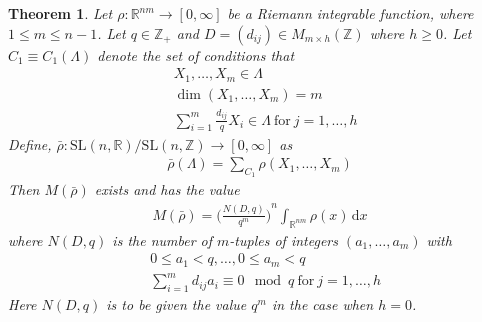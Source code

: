 \documentclass[11pt]{article}
\newtheorem{theorem}{Theorem}[section]
\theoremstyle{definition}
\theoremstyle{proof}
\begin{document}
\begin{theorem}\label{thmi}
    Let $\rho : \mathbb{R}^{nm} \to [0, \infty]$ be a Riemann integrable function, where $1 \leq  m \leq n-1$.
    Let $q \in \mathbb{Z}_+$ and $D = (d_{ij}) \in M_{m \times h} (\mathbb{Z})$ where $h \geq 0$.
    Let $C_1 \equiv C_1(\Lambda )$ denote the set of conditions that
    \begin{equation}
        \begin{split}\label{C1}
            & X_1, \ldots, X_m \in \Lambda \\
            & \dim (X_1, \ldots, X_m) = m \\
            & \sum_{i=1}^{m} \frac{d_{ij}}{q}X_i \in \Lambda \ \text{for} \ j=1, \ldots, h
        \end{split}    
    \end{equation}
    Define, $\bar{\rho } : \mathrm{SL}(n,\mathbb{R})/\mathrm{SL}(n,\mathbb{Z}) \to [0, \infty]$ as
    \begin{equation}\label{rierhobar}
        \begin{split}
            \bar{\rho } (\Lambda ) = \sum_{C_1} \rho (X_1, \ldots,X_m)
        \end{split}
    \end{equation}
    Then $M(\bar{\rho })$ exists and has the value
    \begin{align}
        M(\bar{\rho }) = {\bigg(\frac{N(D,q)}{q^m}\bigg)}^n \int_{\mathbb{R}^{nm}} \rho (x) \,  \mathrm{d} x
    \end{align}
    where $N(D, q)$ is the number of $m$-tuples of integers $(a_1, \ldots, a_m)$ with
    \begin{align*}
        & 0 \leq a_1 < q, \ldots, 0 \leq  a_m < q \\
        & \sum_{i=1}^{m} d_{ij} a_i \equiv 0 \mod q \ \text{for} \ j=1, \ldots, h
    \end{align*}
    Here $N(D, q)$  is to be given the value $q^m$ in the case when $h = 0$.
\end{theorem}
\end{document}
